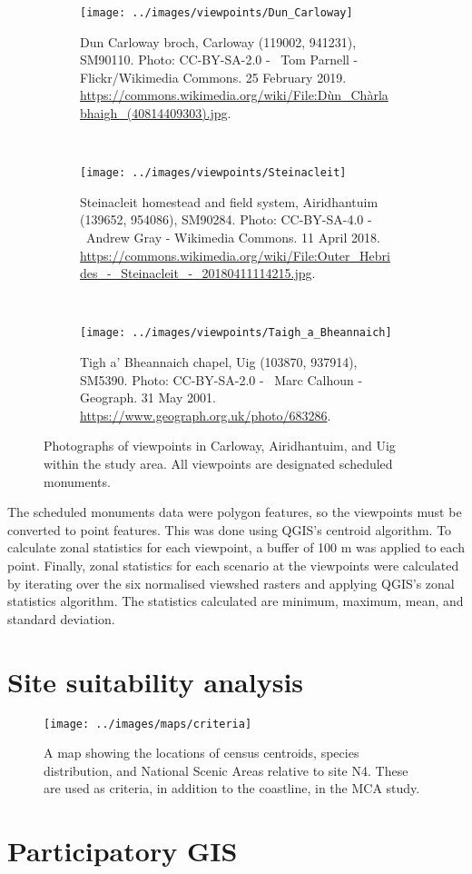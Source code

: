 \begin{figure}
  \centering
  \begin{subfigure}[t]{.48\textwidth}
    \texttt{[image: ../images/viewpoints/Dun\_Carloway]}
    \caption*{Dun Carloway broch, Carloway (119002, 941231), SM90110. Photo: CC-BY-SA-2.0 - \textcopyright~Tom Parnell - Flickr/Wikimedia Commons. 25 February 2019. \url{https://commons.wikimedia.org/wiki/File:Dùn_Chàrlabhaigh_(40814409303).jpg}.}
  \end{subfigure}
  ~
  \begin{subfigure}[t]{.48\textwidth}
    \texttt{[image: ../images/viewpoints/Steinacleit]}
    \caption*{Steinacleit homestead and field system, Airidhantuim (139652, 954086), SM90284. Photo: CC-BY-SA-4.0 - \textcopyright~Andrew Gray - Wikimedia Commons. 11 April 2018. \url{https://commons.wikimedia.org/wiki/File:Outer_Hebrides_-_Steinacleit_-_20180411114215.jpg}.}
  \end{subfigure}
  \\[.5cm]
  \begin{subfigure}[t]{.48\textwidth}
    \texttt{[image: ../images/viewpoints/Taigh\_a\_Bheannaich]}
    \caption*{Tigh a' Bheannaich chapel, Uig (103870, 937914), SM5390. Photo: CC-BY-SA-2.0 - \textcopyright~Marc Calhoun - Geograph. 31 May 2001. \url{https://www.geograph.org.uk/photo/683286}.}
  \end{subfigure}
  \caption{Photographs of viewpoints in Carloway, Airidhantuim, and Uig within the study area. All viewpoints are designated scheduled monuments. \label{fig:viewpoints2}}
\end{figure}

The scheduled monuments data were polygon features, so the viewpoints must be converted to point features. This was done using QGIS's centroid algorithm. To calculate zonal statistics for each viewpoint, a buffer of 100 m was applied to each point. Finally, zonal statistics for each scenario at the viewpoints were calculated by iterating over the six normalised viewshed rasters and applying QGIS's zonal statistics algorithm. The statistics calculated are minimum, maximum, mean, and standard deviation.

\section{Site suitability analysis}

\begin{figure}
  \centering
  \texttt{[image: ../images/maps/criteria]}
  \caption{A map showing the locations of census centroids, species distribution, and National Scenic Areas relative to site N4. These are used as criteria, in addition to the coastline, in the MCA study. \label{fig:criteria}}
\end{figure}

\section{Participatory GIS}
